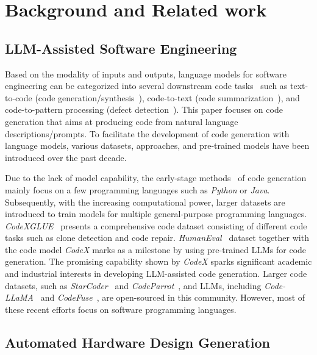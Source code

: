 \section{Background and Related work}
\subsection{LLM-Assisted Software Engineering}\label{sebsec:background_llm_software}

Based on the modality of inputs and outputs,
language models for software engineering can be categorized into several downstream code tasks~\cite{zhang2023unifying} such as text-to-code (code generation/synthesis~\cite{ling2016latent}), code-to-text (code summarization~\cite{iyer2016summarizing}), and code-to-pattern processing (defect detection~\cite{ray2016naturalness}).
This paper focuses on code generation that aims at producing code from natural language descriptions/prompts.
To facilitate the development of code generation with language models, various datasets, approaches, and pre-trained models have been introduced over the past decade.

Due to the lack of model capability,
the early-stage methods~\cite{ling2016latent, iyer2018mapping} of code generation mainly focus on a few programming languages such as \textit{Python} or \textit{Java}.
Subsequently,
with the increasing computational power,
larger datasets are introduced to train models for multiple general-purpose programming languages.
\textit{CodeXGLUE}~\cite{lu2021codexglue} presents a comprehensive code dataset consisting of different code tasks such as clone detection and code repair.
\textit{HumanEval}~\cite{chen2021evaluating} dataset together with the code model \textit{CodeX} marks as a milestone by using pre-trained LLMs for code generation.
The promising capability shown by \textit{CodeX} sparks significant academic and industrial interests in developing LLM-assisted code generation. 
Larger code datasets, such as \textit{StarCoder}~\cite{li2023starcoder} and \textit{CodeParrot}~\cite{tunstall2022natural}, and LLMs, including \textit{Code-LLaMA}~\cite{roziere2023code} and \textit{CodeFuse}~\cite{di2023codefuse}, are open-sourced in this community.
However, most of these recent efforts focus on software programming languages.

\subsection{Automated Hardware Design Generation}\label{sebsec:background_hwgen}


